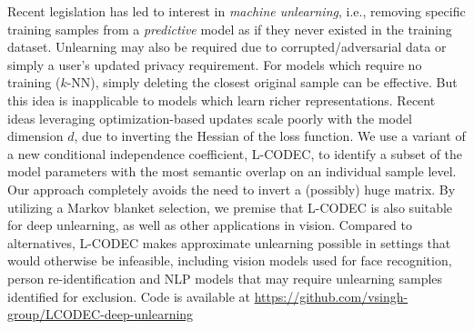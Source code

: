 Recent legislation has
led to interest in {\em machine unlearning}, i.e., removing specific training samples from a {\em predictive} model as if they never existed in the training dataset. 
Unlearning may also be required due to  corrupted/adversarial data or simply a user's updated privacy requirement.
For models which require no training ($k$-NN), 
simply deleting the closest original sample can be effective. 
But this idea is inapplicable to models which learn richer 
representations.
Recent ideas leveraging optimization-based updates
scale poorly with the model dimension $d$,  
due to 
inverting the Hessian of the loss function. %
We use a variant of a new conditional independence coefficient, 
L-CODEC, to identify a subset of the model parameters with the most semantic overlap on an individual sample level. 
Our approach completely avoids the need to invert a (possibly) huge matrix. 
By utilizing a Markov blanket selection, we premise that L-CODEC is also suitable for deep unlearning,
as well as other applications in vision.
Compared to alternatives, L-CODEC makes approximate unlearning possible 
in settings that would otherwise be infeasible, including vision models used for face recognition, person re-identification and NLP models that may require unlearning samples identified for exclusion.
Code is available at \url{https://github.com/vsingh-group/LCODEC-deep-unlearning}



